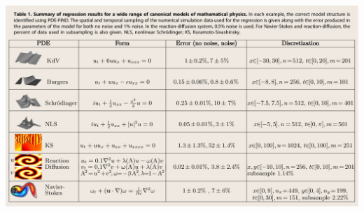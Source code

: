\documentclass[aspectratio=169,compress,12pt]{beamer}
\begin{document}
\begin{frame}
    \vfill
    \centering
    \includegraphics[width=\textwidth]{imgs/pde_find_results.png}
    \vfill
\end{frame}
\end{document}
